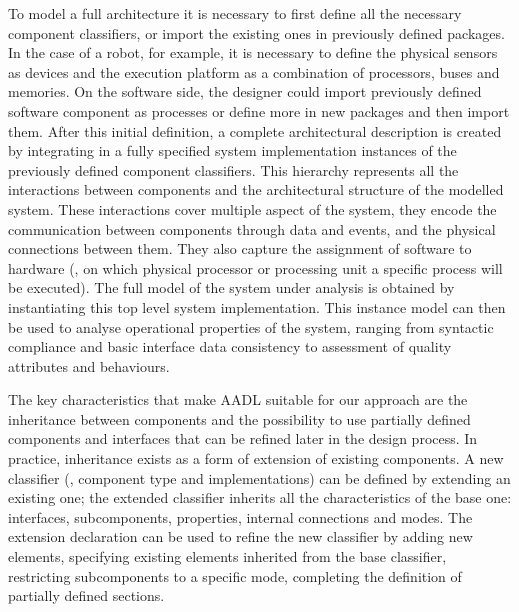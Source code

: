 To model a full architecture it is necessary to first define all the necessary component classifiers, or import the existing ones in previously defined packages. In the case of a robot, for example, it is necessary to define the physical sensors as devices and the execution platform as a combination of processors, buses and memories. On the software side, the designer could import previously defined software component as processes or define more in new packages and then import them. After this initial definition, a complete architectural description is created by integrating in a fully specified system implementation instances of the previously defined component classifiers. This hierarchy represents all the interactions between components and the architectural structure of the modelled system. These interactions cover multiple aspect of the system, they encode the communication between components through data and events, and the physical connections between them. They also capture the assignment of software to hardware (\eg, on which physical processor or processing unit a specific process will be executed). The full model of the system under analysis is obtained by instantiating this top level system implementation. This instance model can then be used to analyse operational properties of the system, ranging from syntactic compliance and basic interface data consistency to assessment of quality attributes and behaviours.

The key characteristics that make AADL suitable for our approach are the inheritance between components and the possibility to use partially defined components and interfaces that can be refined later in the design process. In practice, inheritance exists as a form of extension of existing components. A new classifier (\ie, component type and implementations) can be defined by extending an existing one; the extended classifier inherits all the characteristics of the base one: interfaces, subcomponents, properties, internal connections and modes. The extension declaration can be used to refine the new classifier by adding new elements, specifying existing elements inherited from the base classifier, restricting subcomponents to a specific mode, completing the definition of partially defined sections. 

